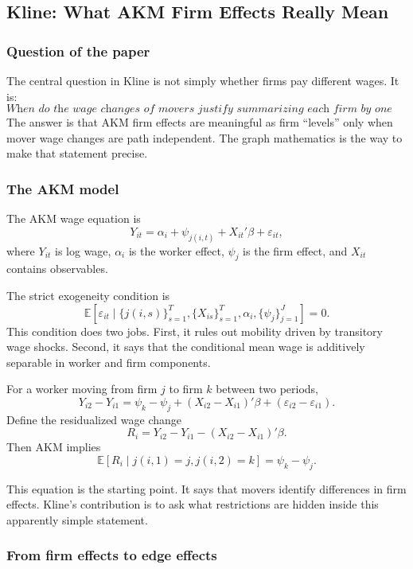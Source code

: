 \documentclass[11pt]{article}
\newcommand{\E}{\mathbb{E}}
\newcommand{\1}{\mathbf{1}}
\begin{document}
\subsection{Kline: What AKM Firm Effects Really Mean}

\subsubsection*{Question of the paper}

The central question in Kline is not simply whether firms pay different wages. It is:
\[
\textit{When do the wage changes of movers justify summarizing each firm by one scalar wage effect?}
\]
The answer is that AKM firm effects are meaningful as firm ``levels'' only when mover wage changes are path independent. The graph mathematics is the way to make that statement precise.

\subsubsection*{The AKM model}

The AKM wage equation is
\[
Y_{it}
=
\alpha_i+\psi_{j(i,t)}+X_{it}'\beta+\varepsilon_{it},
\]
where $Y_{it}$ is log wage, $\alpha_i$ is the worker effect, $\psi_j$ is the firm effect, and $X_{it}$ contains observables.

The strict exogeneity condition is
\[
\E[\varepsilon_{it}\mid \{j(i,s)\}_{s=1}^T,\{X_{is}\}_{s=1}^T,\alpha_i,\{\psi_j\}_{j=1}^J]=0.
\]
This condition does two jobs. First, it rules out mobility driven by transitory wage shocks. Second, it says that the conditional mean wage is additively separable in worker and firm components.

For a worker moving from firm $j$ to firm $k$ between two periods,
\[
Y_{i2}-Y_{i1}
=
\psi_k-\psi_j+(X_{i2}-X_{i1})'\beta+(\varepsilon_{i2}-\varepsilon_{i1}).
\]
Define the residualized wage change
\[
R_i
=
Y_{i2}-Y_{i1}-(X_{i2}-X_{i1})'\beta.
\]
Then AKM implies
\[
\E[R_i\mid j(i,1)=j,j(i,2)=k]
=
\psi_k-\psi_j.
\]

This equation is the starting point. It says that movers identify differences in firm effects. Kline's contribution is to ask what restrictions are hidden inside this apparently simple statement.

\subsubsection*{From firm effects to edge effects}
\end{document}

